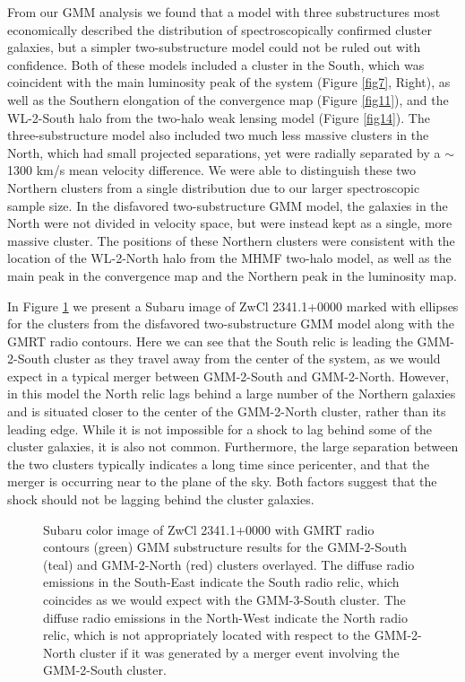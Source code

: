 \documentclass[onecolumn]{aastex}
\begin{document}
From our GMM analysis we found that a model with three substructures most economically described the distribution of spectroscopically confirmed cluster galaxies, but a simpler two-substructure model could not be ruled out with confidence.  Both of these models included a cluster in the South, which was coincident with the main luminosity peak of the system (Figure \ref{fig7}, Right), as well as the Southern elongation of the convergence map (Figure \ref{fig11}), and the WL-2-South halo from the two-halo weak lensing model (Figure \ref{fig14}).  The three-substructure model also included two much less massive clusters in the North, which had small projected separations, yet were radially separated by a $\sim$1300 km/s mean velocity difference.  We were able to distinguish these two Northern clusters from a single distribution due to our larger spectroscopic sample size.  In the disfavored two-substructure GMM model, the galaxies in the North were not divided in velocity space, but were instead kept as a single, more massive cluster.  The positions of these Northern clusters were consistent with the location of the WL-2-North halo from the MHMF two-halo model, as well as the main peak in the convergence map and the Northern peak in the luminosity map.

In Figure \ref{fig15} we present a Subaru image of ZwCl 2341.1+0000 marked with ellipses for the clusters from the disfavored two-substructure GMM model along with the GMRT radio contours.  Here we can see that the South relic is leading the GMM-2-South cluster as they travel away from the center of the system, as we would expect in a typical merger between GMM-2-South and GMM-2-North.  However, in this model the North relic lags behind a large number of the Northern galaxies and is situated closer to the center of the GMM-2-North cluster, rather than its leading edge.  While it is not impossible for a shock to lag behind some of the cluster galaxies, it is also not common.  Furthermore, the large separation between the two clusters typically indicates a long time since pericenter, and that the merger is occurring near to the plane of the sky.  Both factors suggest that the shock should not be lagging behind the cluster galaxies.

\begin{figure} 
\caption{Subaru color image of ZwCl 2341.1+0000 with GMRT radio contours (green) GMM substructure results for the GMM-2-South (teal) and GMM-2-North (red) clusters overlayed.  The diffuse radio emissions in the South-East indicate the South radio relic, which coincides as we would expect with the GMM-3-South cluster.  The diffuse radio emissions in the North-West indicate the North radio relic, which is not appropriately located with respect to the GMM-2-North cluster if it was generated by a merger event involving the GMM-2-South cluster.\label{fig15}}  
\end{figure}
\end{document}
